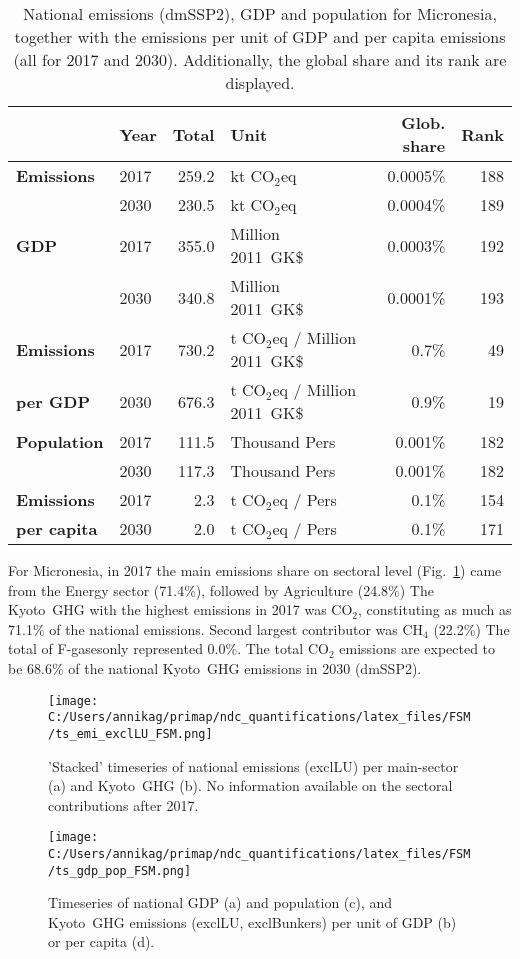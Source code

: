 \documentclass[12pt]{article}
\begin{document}
 \begin{table}[H]
 \centering
 \caption{National emissions (dmSSP2), GDP and population for Micronesia, together with the emissions per unit of GDP and per capita emissions (all for 2017 and 2030). 
 Additionally, the global share and its rank are displayed.}
 \label{tab:overview}
 \begin{tabular}{l || l r l r r}
 \bfseries  & \bfseries Year & \bfseries Total & \bfseries Unit & \bfseries Glob. share & \bfseries Rank \tabularnewline \hline \hline
 \bfseries Emissions & 2017 & 259.2 & kt CO$_2$eq & 0.0005\% & 188 \tabularnewline 
 \bfseries  & 2030 & 230.5 & kt CO$_2$eq & 0.0004\% & 189 \tabularnewline \hline
 \bfseries GDP & 2017 & 355.0 & Million 2011~GK\$ & 0.0003\% & 192 \tabularnewline 
 \bfseries  & 2030 & 340.8 & Million 2011~GK\$ & 0.0001\% & 193 \tabularnewline \hline
 \bfseries Emissions & 2017 & 730.2 & t CO$_2$eq / Million 2011~GK\$ & 0.7\% & 49 \tabularnewline 
 \bfseries per GDP & 2030 & 676.3 & t CO$_2$eq / Million 2011~GK\$ & 0.9\% & 19 \tabularnewline \hline
 \bfseries Population & 2017 & 111.5 & Thousand Pers & 0.001\% & 182 \tabularnewline 
 \bfseries  & 2030 & 117.3 & Thousand Pers & 0.001\% & 182 \tabularnewline \hline
 \bfseries Emissions & 2017 & 2.3 & t CO$_2$eq /  Pers & 0.1\% & 154 \tabularnewline 
 \bfseries per capita & 2030 & 2.0 & t CO$_2$eq /  Pers & 0.1\% & 171 \tabularnewline 
 \end{tabular}
 \end{table}

 For Micronesia, in 2017 the main emissions share on sectoral level (Fig.~\ref{fig:tsEmi}) came from the Energy sector (71.4\%), followed by Agriculture (24.8\%)
 The Kyoto~GHG with the highest emissions in 2017 was CO$_2$, constituting as much as 71.1\% of the national emissions. 
 Second largest contributor was CH$_4$ (22.2\%)
 The total of F-gasesonly represented 0.0\%.
 The total CO$_2$ emissions are expected to be 68.6\% of the national Kyoto~GHG emissions in 2030 (dmSSP2).

 \begin{figure}[H]
 \centering
 \texttt{[image: C:/Users/annikag/primap/ndc\_quantifications/latex\_files/FSM/ts\_emi\_exclLU\_FSM.png]}
 \caption{'Stacked' timeseries of national emissions (exclLU) per main-sector (a) and Kyoto~GHG (b). 
 No information available on the sectoral contributions after 2017.}
 \label{fig:tsEmi}
 \end{figure}

 \begin{figure}[H]
 \centering
 \texttt{[image: C:/Users/annikag/primap/ndc\_quantifications/latex\_files/FSM/ts\_gdp\_pop\_FSM.png]}
 \caption{Timeseries of national GDP (a) and population (c), and Kyoto~GHG emissions (exclLU, exclBunkers) per unit of GDP (b) or per capita (d).}
 \label{fig:tsSocioEco}
 \end{figure}
\end{document}
